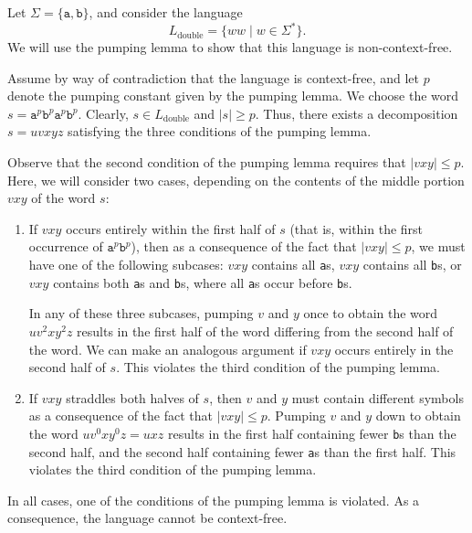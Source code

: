 \begin{example}
Let $\Sigma = \{\texttt{a}, \texttt{b}\}$, and consider the language
\begin{equation*}
L_{\text{double}} = \{ww \mid w \in \Sigma^{*}\}.
\end{equation*}
We will use the pumping lemma to show that this language is non-context-free.

Assume by way of contradiction that the language is context-free, and let $p$ denote the pumping constant given by the pumping lemma. We choose the word $s = \texttt{a}^{p}\texttt{b}^{p}\texttt{a}^{p}\texttt{b}^{p}$. Clearly, $s \in L_{\text{double}}$ and $|s| \geq p$. Thus, there exists a decomposition $s = uvxyz$ satisfying the three conditions of the pumping lemma.

Observe that the second condition of the pumping lemma requires that $|vxy| \leq p$. Here, we will consider two cases, depending on the contents of the middle portion $vxy$ of the word $s$:
\begin{enumerate}
\item If $vxy$ occurs entirely within the first half of $s$ (that is, within the first occurrence of $\texttt{a}^{p}\texttt{b}^{p}$), then as a consequence of the fact that $|vxy| \leq p$, we must have one of the following subcases: $vxy$ contains all \texttt{a}s, $vxy$ contains all \texttt{b}s, or $vxy$ contains both \texttt{a}s and \texttt{b}s, where all \texttt{a}s occur before \texttt{b}s.

In any of these three subcases, pumping $v$ and $y$ once to obtain the word $uv^{2}xy^{2}z$ results in the first half of the word differing from the second half of the word. We can make an analogous argument if $vxy$ occurs entirely in the second half of $s$. This violates the third condition of the pumping lemma.

\item If $vxy$ straddles both halves of $s$, then $v$ and $y$ must contain different symbols as a consequence of the fact that $|vxy| \leq p$. Pumping $v$ and $y$ down to obtain the word $uv^{0}xy^{0}z = uxz$ results in the first half containing fewer \texttt{b}s than the second half, and the second half containing fewer \texttt{a}s than the first half. This violates the third condition of the pumping lemma.
\end{enumerate}

In all cases, one of the conditions of the pumping lemma is violated. As a consequence, the language cannot be context-free.
\end{example}

